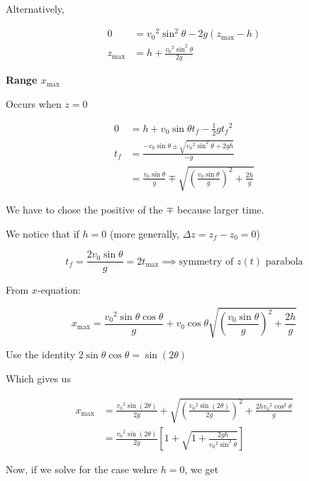 \begin{sol}
\begin{enumerate}[a)]
		Alternatively,

		\begin{align}
			0 &= {v_0}^2\sin^2\theta - 2g(z_{\mathrm{max}} - h)\\
			z_{\mathrm{max}} &= \boxed{h + \frac{{v_0}^2\sin^2\theta}{2g}}
		\end{align}

		\textbf{Range $x_{\mathrm{max}}$}

		Occurs when $z = 0$

		\begin{align}
			0 &= h + v_0\sin\theta t_f - \frac{1}{2}g{t_f}^2\\
			t_f &= \frac{-v_0\sin\theta \pm \sqrt{{v_0}^2\sin^2\theta + 2gh}}{-g}\\
			&= \frac{v_0\sin\theta}{g} \mp \sqrt{\left(\frac{v_0\sin\theta}{g}\right)^2 + \frac{2h}{g}}
		\end{align}

		\begin{remark}
			We have to chose the positive of the $\mp$ because larger time.
		\end{remark}

		We notice that if $h = 0$ (more generally, $\Delta z = z_f - z_0 = 0$)

		\begin{equation}
			t_f = \frac{2v_0\sin\theta}{g} = 2t_\mathrm{max} \implies \text{symmetry of $z(t)$ parabola}
		\end{equation}

		From $x$-equation:

		\begin{equation}
			x_\mathrm{max} = \frac{{v_0}^2\sin\theta\cos\theta}{g} + v_0 \cos\theta \sqrt{\left(\frac{v_0\sin\theta}{g}\right)^2 + \frac{2h}{g}}
		\end{equation}

		Use the identity $2\sin\theta\cos\theta = \sin(2\theta)$

		Which gives us

		\begin{align}
			x_\mathrm{max} &= \boxed{\frac{{v_0}^2\sin(2\theta)}{2g} + \sqrt{\left(\frac{{v_0}^2\sin(2\theta)}{2g}\right)^2 + \frac{2h{v_0}^2\cos^2\theta}{g}}}\\
			&= \frac{{v_0}^2\sin(2\theta)}{2g} \left[1 + \sqrt{1 + \frac{2gh}{{v_0}^2\sin^2\theta}}\right]
		\end{align}

		Now, if we solve for the case wehre $h = 0$, we get


\end{enumerate}
\end{sol}
